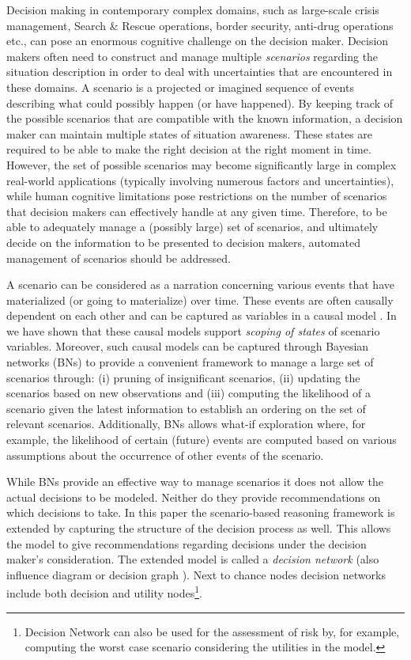 \documentclass[conference]{IEEEtran}
\begin{document}
Decision making in contemporary complex domains, such as large-scale crisis management, Search \& Rescue operations, border security, anti-drug operations etc., can pose an enormous cognitive challenge on the decision maker. Decision makers often need to construct and manage multiple {\em scenarios} regarding the situation description in order to deal with uncertainties that are encountered in these domains. A scenario is a projected or imagined sequence of events describing what could possibly happen (or have happened). By keeping track of the possible scenarios that are compatible with the known information, a decision maker can maintain multiple states of situation awareness. These states are required to be able to make the right decision at the right moment in time. However, the set of possible scenarios may become significantly large in complex real-world applications (typically involving numerous factors and uncertainties), while human cognitive limitations pose restrictions on the number of scenarios that decision makers can effectively handle at any given time. Therefore, to be able to adequately manage a (possibly large) set of scenarios, and  ultimately decide on the information to be presented to decision makers, automated management of scenarios should be addressed.

A scenario can be considered as a narration concerning various events that have materialized (or going to materialize) over time. These events are often causally dependent on each other and can be captured as variables in a causal model \cite{pearl00book}. In \cite{conrado14if} we have shown that these causal models support {\em scoping of states} of scenario variables. Moreover, such causal models can be captured through Bayesian networks (BNs) \cite{pearl88book, jensen07book} to provide a convenient framework to manage a large set of scenarios through: (i) pruning of insignificant scenarios, (ii) updating the scenarios based on new observations and (iii) computing the likelihood of a scenario given the latest information to establish an ordering on the set of relevant scenarios. Additionally, BNs allows what-if exploration where, for example, the likelihood of certain (future) events are computed based on various assumptions about the occurrence of other events of the scenario.

While BNs provide an effective way to manage scenarios it does not allow the actual decisions to be modeled. Neither do they provide recommendations on which decisions to take. In this paper the scenario-based reasoning framework is extended by capturing the structure of the decision process as well. This allows the model to give recommendations regarding decisions under the decision maker's consideration. The extended model is called a {\em decision network} \cite{russell02bn} (also influence diagram or decision graph \cite{jensen07book}). Next to chance nodes decision networks include both decision and utility nodes\footnote{Decision Network can also be used for the assessment of risk by, for example, computing the worst case scenario considering the utilities in the model.}.
\end{document}
